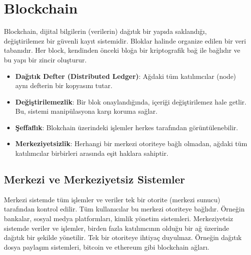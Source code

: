 \section{Blockchain}

Blockchain, dijital bilgilerin (verilerin) dağıtık bir yapıda saklandığı, değiştirilemez bir güvenli kayıt sistemidir. Bloklar halinde organize edilen bir veri tabanıdır. Her block, kendinden önceki bloğa bir kriptografik bağ ile bağlıdır ve bu yapı bir zincir oluşturur.

\begin{itemize}
    \item \textbf{Dağıtık Defter (Distributed Ledger)}: Ağdaki tüm katılımcılar (node) aynı defterin bir kopyasını tutar.
    \item \textbf{Değiştirilemezlik}: Bir blok onaylandığında, içeriği değiştirilemez hale getlir. Bu, sistemi manipülasyona karşı koruma sağlar.
    \item \textbf{Şeffaflık}: Blokchain üzerindeki işlemler herkes tarafından görüntülenebilir.
    \item \textbf{Merkeziyetsizlik}: Herhangi bir merkezi otoriteye bağlı olmadan, ağdaki tüm katılımcılar birbirleri arasında eşit haklara sahiptir. 
\end{itemize}

\subsection{Merkezi ve Merkeziyetsiz Sistemler}

Merkezi sistemde tüm işlemler ve veriler tek bir otorite (merkezi sunucu) tarafından kontrol edilir. Tüm kullanıcılar bu merkezi otoriteye bağlıdır. Örneğin bankalar, sosyal medya platformları, kimlik yönetim sistemleri. Merkeziyetsiz sistemde veriler ve işlemler, birden fazla katılımcının olduğu bir ağ üzerinde dağıtık bir şekilde yönetilir. Tek bir otoriteye ihtiyaç duyulmaz. Örneğin dağıtık dosya paylaşım sistemleri, bitcoin ve ethereum gibi blockchain ağları.


